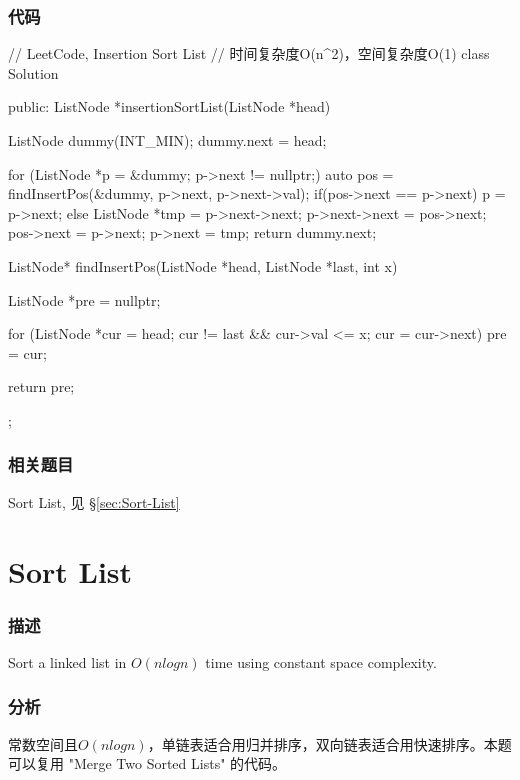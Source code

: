 \subsubsection{代码}
\begin{Code}
// LeetCode, Insertion Sort List
// 时间复杂度O(n^2)，空间复杂度O(1)
class Solution {
public:
    ListNode *insertionSortList(ListNode *head) {
        ListNode dummy(INT_MIN);
        dummy.next = head;

        for (ListNode *p = &dummy; p->next != nullptr;) {
        auto pos = findInsertPos(&dummy, p->next, p->next->val);
        if(pos->next == p->next){
            p = p->next;
        }else{
            ListNode *tmp = p->next->next;
            p->next->next = pos->next;
            pos->next = p->next;
            p->next = tmp;
            }
    }
        return dummy.next;
    }

    ListNode* findInsertPos(ListNode *head, ListNode *last, int x) {
        ListNode *pre = nullptr;
             
        for (ListNode *cur = head; cur != last && cur->val <= x; cur = cur->next)
              pre = cur;
    
        return pre;
    }
};
\end{Code}


\subsubsection{相关题目}
\begindot
\item Sort List, 见 \S \ref{sec:Sort-List}
\myenddot


\section{Sort List} %
\label{sec:sort-list}


\subsubsection{描述}
Sort a linked list in $O(n log n)$ time using constant space complexity.


\subsubsection{分析}
常数空间且$O(nlogn)$，单链表适合用归并排序，双向链表适合用快速排序。本题可以复用 "Merge Two Sorted Lists" 的代码。


